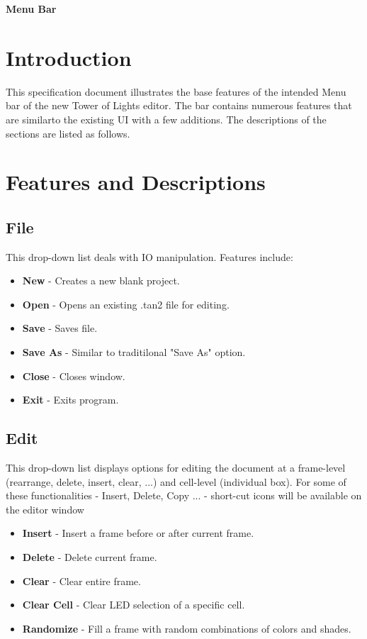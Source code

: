 \documentclass[preprint,12pt]{article}
\begin{document}
\centerline{\textbf {\large Menu Bar}}



\section{Introduction}

{This specification document illustrates the base features of the intended Menu bar of the new Tower of Lights editor. The bar contains numerous features that are similarto the existing UI with a few additions. The descriptions of the sections are listed as follows.}

\section{Features and Descriptions}

\subsection{File}

{This drop-down list deals with IO manipulation. Features include:}

\begin{itemize}
\item \textbf{New} - Creates a new blank project. 
\item \textbf{Open} - Opens an existing .tan2 file for editing.
\item \textbf{Save} - Saves file.
\item \textbf{Save As} - Similar to traditilonal "Save As" option.
\item \textbf{Close} - Closes window. 
\item \textbf{Exit} - Exits program.

\end{itemize}

\subsection{Edit}

{This drop-down list displays options for editing the document at a frame-level (rearrange, delete, insert, clear, ...) and cell-level (individual box). For some of these functionalities - Insert, Delete, Copy ... - short-cut icons will be available on the editor window}

\begin{itemize}
\item \textbf{Insert} - Insert a frame before or after current frame.
\item \textbf{Delete} - Delete current frame.
\item \textbf{Clear} - Clear entire frame.
\item \textbf{Clear Cell} - Clear LED selection of a specific cell.
\item \textbf{Randomize} - Fill a frame with random combinations of colors and shades.
\end{itemize}
\end{document}
